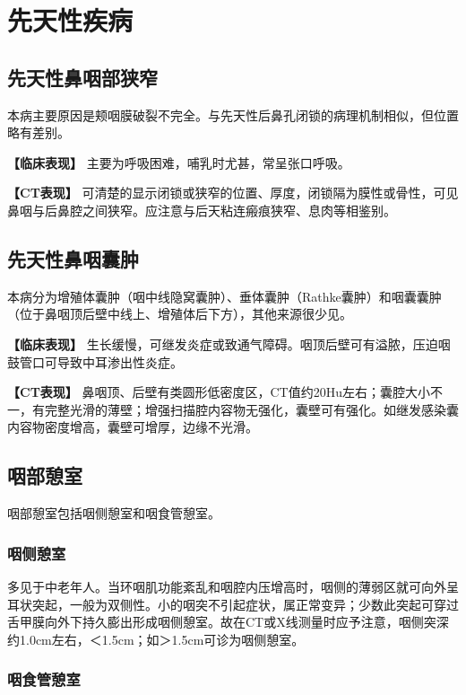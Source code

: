 \section{先天性疾病}

\subsection{先天性鼻咽部狭窄}

本病主要原因是颊咽膜破裂不完全。与先天性后鼻孔闭锁的病理机制相似，但位置略有差别。

\textbf{【临床表现】} 主要为呼吸困难，哺乳时尤甚，常呈张口呼吸。

\textbf{【CT表现】}
可清楚的显示闭锁或狭窄的位置、厚度，闭锁隔为膜性或骨性，可见鼻咽与后鼻腔之间狭窄。应注意与后天粘连瘢痕狭窄、息肉等相鉴别。

\subsection{先天性鼻咽囊肿}

本病分为增殖体囊肿（咽中线隐窝囊肿）、垂体囊肿（Rathke囊肿）和咽囊囊肿（位于鼻咽顶后壁中线上、增殖体后下方），其他来源很少见。

\textbf{【临床表现】}
生长缓慢，可继发炎症或致通气障碍。咽顶后壁可有溢脓，压迫咽鼓管口可导致中耳渗出性炎症。

\textbf{【CT表现】}
鼻咽顶、后壁有类圆形低密度区，CT值约20Hu左右；囊腔大小不一，有完整光滑的薄壁；增强扫描腔内容物无强化，囊壁可有强化。如继发感染囊内容物密度增高，囊壁可增厚，边缘不光滑。

\subsection{咽部憩室}

咽部憩室包括咽侧憩室和咽食管憩室。

\subsubsection{咽侧憩室}

多见于中老年人。当环咽肌功能紊乱和咽腔内压增高时，咽侧的薄弱区就可向外呈耳状突起，一般为双侧性。小的咽突不引起症状，属正常变异；少数此突起可穿过舌甲膜向外下持久膨出形成咽侧憩室。故在CT或X线测量时应予注意，咽侧突深约1.0cm左右，＜1.5cm；如＞1.5cm可诊为咽侧憩室。

\subsubsection{咽食管憩室}

